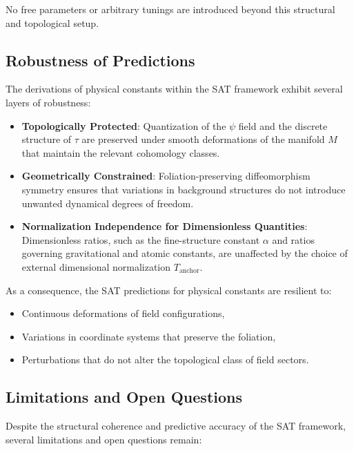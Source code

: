 \documentclass[12pt]{article}
\begin{document}
No free parameters or arbitrary tunings are introduced beyond this structural and topological setup.

\subsection{Robustness of Predictions}

The derivations of physical constants within the SAT framework exhibit several layers of robustness:

\begin{itemize}
    \item \textbf{Topologically Protected}: Quantization of the \( \psi \) field and the discrete structure of \( \tau \) are preserved under smooth deformations of the manifold \( M \) that maintain the relevant cohomology classes.
    \item \textbf{Geometrically Constrained}: Foliation-preserving diffeomorphism symmetry ensures that variations in background structures do not introduce unwanted dynamical degrees of freedom.
    \item \textbf{Normalization Independence for Dimensionless Quantities}: Dimensionless ratios, such as the fine-structure constant \( \alpha \) and ratios governing gravitational and atomic constants, are unaffected by the choice of external dimensional normalization \( T_{\text{anchor}} \).
\end{itemize}

As a consequence, the SAT predictions for physical constants are resilient to:

\begin{itemize}
    \item Continuous deformations of field configurations,
    \item Variations in coordinate systems that preserve the foliation,
    \item Perturbations that do not alter the topological class of field sectors.
\end{itemize}

\subsection{Limitations and Open Questions}

Despite the structural coherence and predictive accuracy of the SAT framework, several limitations and open questions remain:
\end{document}
